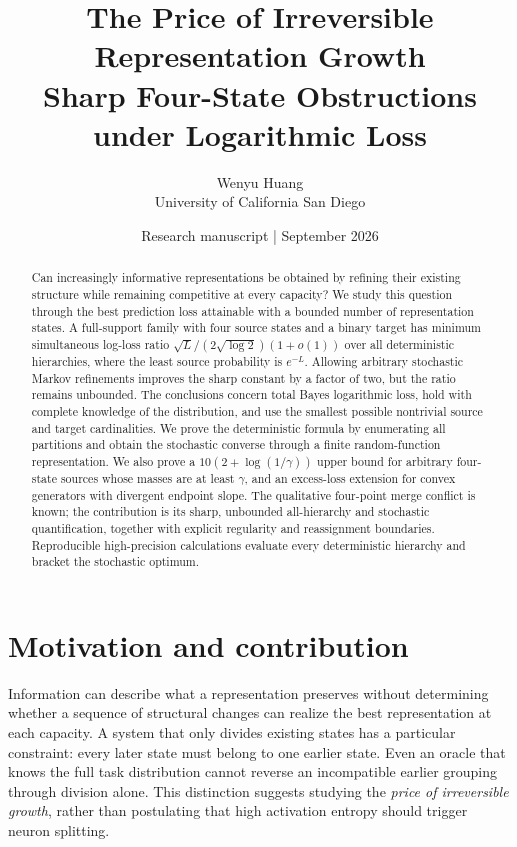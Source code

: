 \documentclass[11pt]{article}
\title{The Price of Irreversible Representation Growth\\[4pt]
\large Sharp Four-State Obstructions under Logarithmic Loss}
\author{Wenyu Huang\\University of California San Diego}
\date{Research manuscript \;|\; September 2026}
\theoremstyle{remark}\newtheorem{remark}[theorem]{Remark}
\begin{document}
\maketitle
\begin{abstract}
Can increasingly informative representations be obtained by refining their
existing structure while remaining competitive at every capacity? We study
this question through the best prediction loss attainable with a bounded
number of representation states. A full-support family with four source
states and a binary target has minimum simultaneous log-loss ratio
$\sqrt{L}/(2\sqrt{\log 2})(1+o(1))$ over all deterministic hierarchies,
where the least source probability is $e^{-L}$. Allowing arbitrary stochastic
Markov refinements improves the sharp constant by a factor of two, but the
ratio remains unbounded. The conclusions concern total Bayes logarithmic
loss, hold with complete knowledge of the distribution, and use the smallest
possible nontrivial source and target cardinalities. We prove the deterministic
formula by enumerating all partitions and obtain the stochastic converse
through a finite random-function representation. We also prove a
$10(2+\log(1/\gamma))$ upper bound for arbitrary four-state sources whose
masses are at least $\gamma$, and an excess-loss extension for convex
generators with divergent endpoint slope. The qualitative four-point
merge conflict is known; the contribution is its sharp, unbounded
all-hierarchy and stochastic quantification, together with explicit
regularity and reassignment boundaries. Reproducible high-precision
calculations evaluate every deterministic hierarchy and bracket the
stochastic optimum.
\end{abstract}
\tableofcontents

\section{Motivation and contribution}
Information can describe what a representation preserves without determining
whether a sequence of structural changes can realize the best representation
at each capacity. A system that only divides existing states has a particular
constraint: every later state must belong to one earlier state. Even an
oracle that knows the full task distribution cannot reverse an incompatible
earlier grouping through division alone. This distinction suggests studying
the \emph{price of irreversible growth}, rather than postulating that high
activation entropy should trigger neuron splitting.
\end{document}
